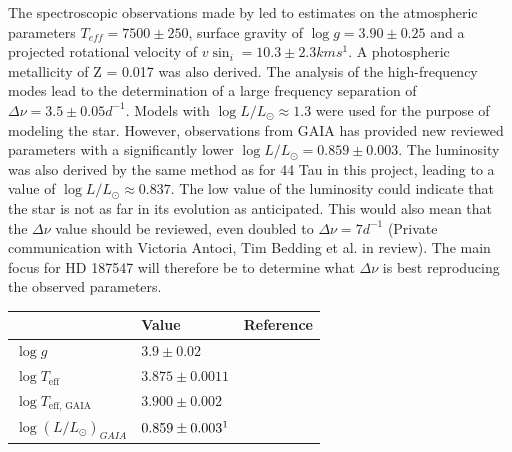 The spectroscopic observations made by \citet{antoci2011excitation} led to estimates on the atmospheric parameters $T_{eff} = 7500 \pm 250$, surface gravity of $\log g = 3.90 \pm 0.25$ and a projected rotational velocity of $v \sin_i = 10.3 \pm 2.3 kms^1$. A photospheric metallicity of Z = 0.017 was also derived. The analysis of the high-frequency modes lead to the determination of a large frequency separation of $\Delta \nu = 3.5 \pm 0.05 d^{-1}$. Models with $\log L/L_\odot \approx 1.3$ were used for the purpose of modeling the star. However, observations from GAIA has provided new reviewed parameters with a significantly lower $ \log L/L_\odot = 0.859 \pm 0.003$. The luminosity was also derived by the same method as for 44 Tau in this project, leading to a value of $\log L/L_\odot \approx 0.837$. The low value of the luminosity could indicate that the star is not as far in its evolution as \citet{antoci2011excitation, antoci2014role} anticipated. This would also mean that the $\Delta \nu $ value should be reviewed, even doubled to $\Delta \nu = 7 d^{-1}$ (Private communication with Victoria Antoci, Tim Bedding et al. in review). The main focus for HD 187547 will therefore be to determine what $\Delta \nu$ is best reproducing the observed parameters. 


\begin{table}[htbp]
	\centering
	\begin{tabular}{|l|ll|}
		\hline
		& Value                                             & Reference \\ \hline
		$\log g$                                  &  $3.9 \pm 0.02$                            & \citep{antoci2011excitation}    \\
		$\log T_\text{eff}$             & $3.875  \pm 0.0011$                   &   \citep{antoci2011excitation}   \\
		$\log T_\text{eff, GAIA}$ &  $3.900 \pm 0.002$                  & \citep{brown2018gaia} \\
		$\log (L/L_\odot)_{GAIA}$& $0.859 \pm 0.003\footnotemark{}$                   &  \citep{brown2018gaia}   \\ \hline
	\end{tabular}
\end{table}


